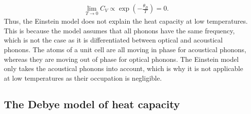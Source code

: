\begin{align}
    \lim_{T \to 0}C_V\propto \exp\left(-\frac{\theta_B}{T}\right) =0.
    \label{eq:cv_einstein_low}
\end{align}
Thus, the Einstein model does not explain the heat capacity at low temperatures.
This is because the model assumes that all phonons have the same frequency, which is not the case as it is differentiated between optical and acoustical phonons.
The atoms of a unit cell are all moving in phase for acoustical phonons, whereas they are moving out of phase for optical phonons.
The Einstein model only takes the acoustical phonons into account, which is why it is not applicable at low temperatures as their occupation is negligible. %

\subsection{The Debye model of heat capacity}
\label{sec:debye}

